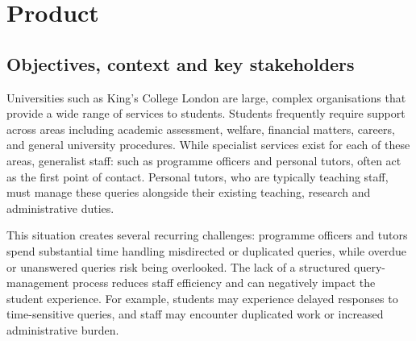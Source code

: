 \chapter{Product}
\label{sect:product}

\section{Objectives, context and key stakeholders}
\label{sect:objectives}
Universities such as King’s College London are large, complex organisations that provide a wide range of services to students. Students frequently require support across areas including academic assessment, welfare, financial matters, careers, and general university procedures. While specialist services exist for each of these areas, generalist staff: such as programme officers and personal tutors, often act as the first point of contact. Personal tutors, who are typically teaching staff, must manage these queries alongside their existing teaching, research and administrative duties.

This situation creates several recurring challenges: programme officers and tutors spend substantial time handling misdirected or duplicated queries, while overdue or unanswered queries risk being overlooked. The lack of a structured query-management process reduces staff efficiency and can negatively impact the student experience. For example, students may experience delayed responses to time-sensitive queries, and staff may encounter duplicated work or increased administrative burden.

